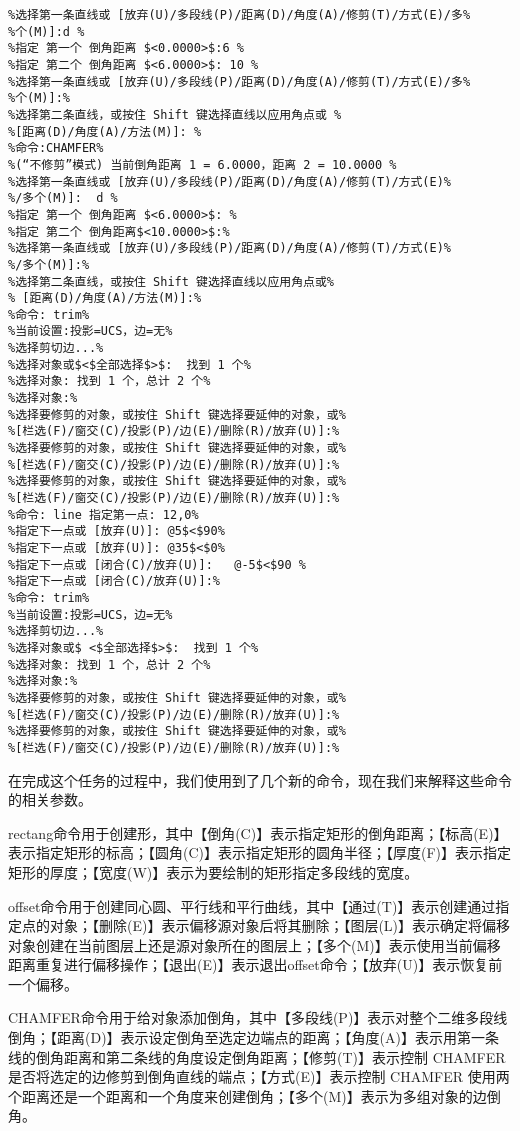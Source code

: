 \begin{lstlisting}
%选择第一条直线或 [放弃(U)/多段线(P)/距离(D)/角度(A)/修剪(T)/方式(E)/多%
%个(M)]:d %
%指定 第一个 倒角距离 $<0.0000>$:6 %
%指定 第二个 倒角距离 $<6.0000>$: 10 %
%选择第一条直线或 [放弃(U)/多段线(P)/距离(D)/角度(A)/修剪(T)/方式(E)/多%
%个(M)]:%
%选择第二条直线，或按住 Shift 键选择直线以应用角点或 %
%[距离(D)/角度(A)/方法(M)]: %
%命令:CHAMFER%
%(“不修剪”模式) 当前倒角距离 1 = 6.0000，距离 2 = 10.0000 %
%选择第一条直线或 [放弃(U)/多段线(P)/距离(D)/角度(A)/修剪(T)/方式(E)%
%/多个(M)]:  d %
%指定 第一个 倒角距离 $<6.0000>$: %
%指定 第二个 倒角距离$<10.0000>$:%
%选择第一条直线或 [放弃(U)/多段线(P)/距离(D)/角度(A)/修剪(T)/方式(E)%
%/多个(M)]:%
%选择第二条直线，或按住 Shift 键选择直线以应用角点或%
% [距离(D)/角度(A)/方法(M)]:%
%命令: trim%
%当前设置:投影=UCS，边=无%
%选择剪切边...%
%选择对象或$<$全部选择$>$:  找到 1 个%
%选择对象: 找到 1 个，总计 2 个%
%选择对象:%
%选择要修剪的对象，或按住 Shift 键选择要延伸的对象，或%
%[栏选(F)/窗交(C)/投影(P)/边(E)/删除(R)/放弃(U)]:%
%选择要修剪的对象，或按住 Shift 键选择要延伸的对象，或%
%[栏选(F)/窗交(C)/投影(P)/边(E)/删除(R)/放弃(U)]:%
%选择要修剪的对象，或按住 Shift 键选择要延伸的对象，或%
%[栏选(F)/窗交(C)/投影(P)/边(E)/删除(R)/放弃(U)]:%
%命令: line 指定第一点: 12,0%
%指定下一点或 [放弃(U)]: @5$<$90%
%指定下一点或 [放弃(U)]: @35$<$0%
%指定下一点或 [闭合(C)/放弃(U)]:   @-5$<$90 %
%指定下一点或 [闭合(C)/放弃(U)]:%
%命令: trim%
%当前设置:投影=UCS，边=无%
%选择剪切边...%
%选择对象或$ <$全部选择$>$:  找到 1 个%
%选择对象: 找到 1 个，总计 2 个%
%选择对象:%
%选择要修剪的对象，或按住 Shift 键选择要延伸的对象，或%
%[栏选(F)/窗交(C)/投影(P)/边(E)/删除(R)/放弃(U)]:%
%选择要修剪的对象，或按住 Shift 键选择要延伸的对象，或%
%[栏选(F)/窗交(C)/投影(P)/边(E)/删除(R)/放弃(U)]:%
\end{lstlisting}
在完成这个任务的过程中，我们使用到了几个新的命令，现在我们来解释这些命令的相关参数。

 rectang命令用于创建形，其中【倒角(C)】表示指定矩形的倒角距离；【标高(E)】表示指定矩形的标高；【圆角(C)】表示指定矩形的圆角半径；【厚度(F)】表示指定矩形的厚度；【宽度(W)】表示为要绘制的矩形指定多段线的宽度。
 
offset命令用于创建同心圆、平行线和平行曲线，其中【通过(T)】表示创建通过指定点的对象；【删除(E)】表示偏移源对象后将其删除；【图层(L)】表示确定将偏移对象创建在当前图层上还是源对象所在的图层上；【多个(M)】表示使用当前偏移距离重复进行偏移操作；【退出(E)】表示退出offset命令；【放弃(U)】表示恢复前一个偏移。

 CHAMFER命令用于给对象添加倒角，其中【多段线(P)】表示对整个二维多段线倒角；【距离(D)】表示设定倒角至选定边端点的距离；【角度(A)】表示用第一条线的倒角距离和第二条线的角度设定倒角距离；【修剪(T)】表示控制 CHAMFER 是否将选定的边修剪到倒角直线的端点；【方式(E)】表示控制 CHAMFER 使用两个距离还是一个距离和一个角度来创建倒角；【多个(M)】表示为多组对象的边倒角。

